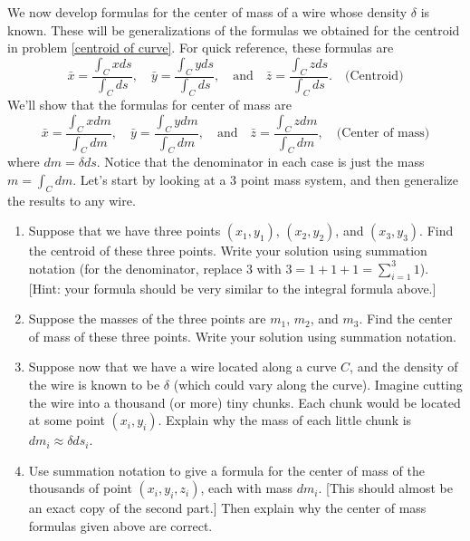 \begin{problem}\label{center of mass of curve}%
%
We now develop formulas for the center of mass of a wire whose density $\delta$ is known. These will be generalizations of the formulas we obtained for the centroid in problem \ref{centroid of curve}. For quick reference, these formulas are 
$$
\bar x = \frac{\int_C x ds}{\int_C  ds},\quad
\bar y = \frac{\int_C y ds}{\int_C  ds},\quad 
\text{and}\quad
\bar z = \frac{\int_C z ds}{\int_C  ds}.  \quad\text{(Centroid)}
$$
We'll show that the formulas for center of mass are  %
$$
\bar x = \frac{\int_C x dm}{\int_C  dm},\quad
\bar y = \frac{\int_C y dm}{\int_C  dm},\quad 
\text{and}\quad
\bar z = \frac{\int_C z dm}{\int_C  dm},  \quad\text{(Center of mass)}
$$
where $dm=\delta ds$. Notice that the denominator in each case is just the mass $m=\int_C dm$.
Let's start by looking at a 3 point mass system, and then generalize the results to any wire. 
\begin{enumerate}
 \item Suppose that we have three points $(x_1,y_1)$, $(x_2,y_2)$, and $(x_3,y_3)$. Find the centroid of these three points. Write your solution using summation notation (for the denominator, replace 3 with $3=1+1+1=\sum_{i=1}^3 1$). [Hint: your formula should be very similar to the integral formula above.]
 \item Suppose the masses of the three points are $m_1$, $m_2$, and  $m_3$. Find the center of mass of these three points. Write your solution using summation notation.
 \item Suppose now that we have a wire located along a curve $C$, and the density of the wire is known to be $\delta$ (which could vary along the curve). Imagine cutting the wire into a thousand (or more) tiny chunks.  Each chunk would be located at some point $(x_i,y_i)$. Explain why the mass of each little chunk is $dm_i\approx\delta ds_i$. 
 \item Use summation notation to give a formula for the center of mass of the thousands of point $(x_i,y_i,z_i)$, each with mass $dm_i.$ [This should almost be an exact copy of the second part.] 
 Then explain why the center of mass formulas given above are correct.
\end{enumerate}
 
\end{problem}

